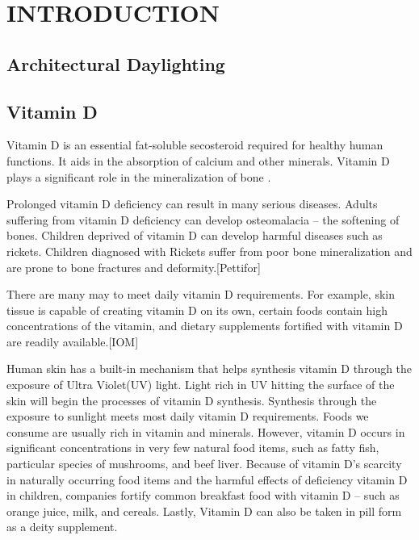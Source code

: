 \chapter{INTRODUCTION} \label{sec:introduction}

\section{Architectural Daylighting}

\section{Vitamin D}

Vitamin D is an essential fat-soluble secosteroid required for healthy human functions. It aids in the absorption of calcium and other minerals.  Vitamin D plays a significant role in the mineralization of bone \cite{Ross}.   

Prolonged vitamin D deficiency can result in many serious diseases.
 Adults suffering from vitamin D deficiency can develop osteomalacia -- the softening of bones. Children deprived of vitamin D can develop harmful diseases such as rickets. Children diagnosed with Rickets suffer from poor bone mineralization and are prone to bone fractures and deformity.[Pettifor] 

There are many may to meet daily vitamin D requirements. For example, skin tissue is capable of creating vitamin D on its own, certain foods contain high concentrations of the vitamin, and dietary supplements fortified with vitamin D are readily available.[IOM]

Human skin has a built-in mechanism that helps synthesis vitamin D through the exposure of Ultra Violet(UV) light. Light rich in UV hitting the surface of the skin will begin the processes of vitamin D synthesis. Synthesis through the exposure to sunlight meets most daily vitamin D requirements. Foods we consume are usually rich in vitamin and minerals. However, vitamin D occurs in significant concentrations in very few natural food items, such as fatty fish, particular species of mushrooms, and beef liver.  Because of vitamin D's scarcity in naturally occurring food items and the harmful effects of deficiency vitamin D  in children, companies fortify common breakfast food with vitamin D -- such as orange juice, milk, and cereals. Lastly, Vitamin D can also be taken in pill form as a deity supplement.

